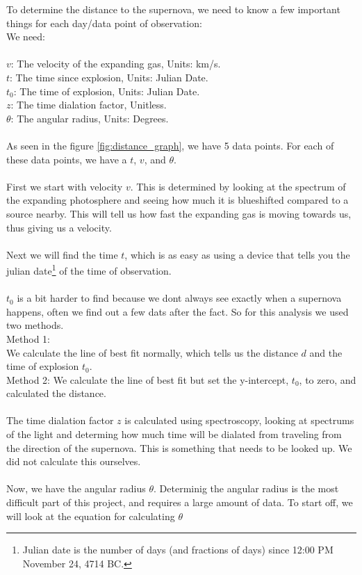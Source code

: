 To determine the distance to the supernova, we need to know a 
few important things for each day/data point of observation:
\\
We need:
\\
\\
$v$: The velocity of the expanding gas, Units: km/s.
\\
$t$: The time since explosion, Units: Julian Date.
\\
$t_0$: The time of explosion, Units: Julian Date.
\\
$z$: The time dialation factor, Unitless.
\\
$\theta$: The angular radius, Units: Degrees.
\\
\\
As seen in the figure \ref{fig:distance_graph}, we have 5 data points. 
For each of these data points, we have a $t$, $v$, and $\theta$.
\\
\\
First we start with velocity $v$. This is determined by looking at 
the spectrum of the expanding photosphere and seeing how much it is blueshifted compared to 
a source nearby. This will tell us how fast the expanding gas is moving towards us, thus 
giving us a velocity.
\\
\\
Next we will find the time $t$, which is as easy as using a device that tells you the 
julian date\footnote{Julian date is the number of days (and fractions of days) 
since 12:00 PM November 24, 4714 BC.} of the time of observation. 
\\
\\
$t_0$ is a bit harder to find because we dont always see exactly when a supernova 
happens, often we find out a few dats after the fact. So for this analysis we used two methods.
\\
Method 1: 
\\
We calculate the line of best fit normally, which tells us the distance $d$ and the time of explosion $t_0$.
\\
Method 2: 
We calculate the line of best fit but set the y-intercept, $t_0$, to zero, and calculated the distance.
\\
\\
The time dialation factor $z$ is calculated using spectroscopy, looking at spectrums of the light and determing 
how much time will be dialated from traveling from the direction of the supernova. This is something that needs 
to be looked up. We did not calculate this ourselves.
\\
\\
Now, we have the angular radius $\theta$. Determinig the angular radius is the most difficult part of this project,
and requires a large amount of data. To start off, we will look at the equation for calculating $\theta$